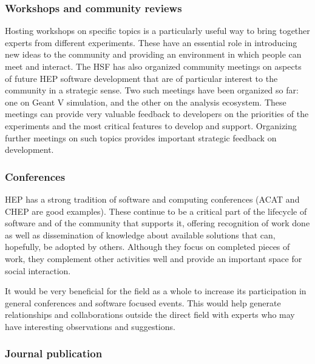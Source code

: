 \documentclass[12pt,a4paper]{article}
\begin{document}
\hypertarget{workshops-and-community-reviews}{%
\subsubsection{Workshops and community
reviews}\label{workshops-and-community-reviews}}

Hosting workshops on specific topics is a particularly useful way to
bring together experts from different experiments. These have an
essential role in introducing new ideas to the community and providing
an environment in which people can meet and interact. The HSF has also
organized community meetings on aspects of future HEP software
development that are of particular interest to the community in a
strategic sense. Two such meetings have been organized so far: one on
Geant V simulation, and the other on the analysis ecosystem. These
meetings can provide very valuable feedback to developers on the
priorities of the experiments and the most critical features to develop
and support. Organizing further meetings on such topics provides
important strategic feedback on development.

\hypertarget{conferences}{%
\subsubsection{Conferences}\label{conferences}}

HEP has a strong tradition of software and computing conferences (ACAT
and CHEP are good examples). These continue to be a critical part of the
lifecycle of software and of the community that supports it, offering
recognition of work done as well as dissemination of knowledge about
available solutions that can, hopefully, be adopted by others. Although
they focus on completed pieces of work, they complement other activities
well and provide an important space for social interaction.

It would be very beneficial for the field as a whole to increase its
participation in general conferences and software focused events. This
would help generate relationships and collaborations outside the direct
field with experts who may have interesting observations and
suggestions.

\hypertarget{journal-publication}{%
\subsubsection{Journal publication}\label{journal-publication}}
\end{document}

